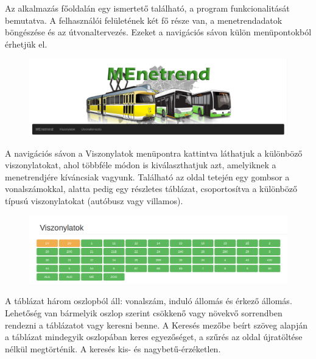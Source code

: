



Az alkalmazás főoldalán egy ismertető található, a program funkcionalitását bemutatva.
A felhasználói felületének két fő része van, a menetrendadatok böngészése és az útvonaltervezés. Ezeket a navigációs sávon külön menüpontokból érhetjük el.

\begin{figure}[htb]
\centering
\includegraphics[scale=0.32]{kepek/navbar.png}
\caption{}
\label{fig:navbar}
\end{figure}

A navigációs sávon a Viszonylatok menüpontra kattintva láthatjuk a különböző viszonylatokat, ahol többféle módon is kiválaszthatjuk azt, amelyiknek a menetrendjére kíváncsiak vagyunk. Található az oldal tetején egy gombsor a vonalszámokkal, alatta pedig egy részletes táblázat, csoportosítva a különböző típusú viszonylatokat (autóbusz vagy villamos).

\begin{figure}[htb]
\centering
\includegraphics[scale=0.32]{kepek/viszonylatok_gombsor.png}
\caption{}
\label{fig:viszonylatok_gombsor}
\end{figure}

A táblázat három oszlopból áll: vonalszám, induló állomás és érkező állomás. Lehetőség van bármelyik oszlop szerint csökkenő vagy növekvő sorrendben rendezni a táblázatot vagy keresni benne. A Keresés mezőbe beírt szöveg alapján a táblázat mindegyik oszlopában keres egyezőséget, a szűrés az oldal újratöltése nélkül megtörténik. A keresés kis- és nagybetű-érzéketlen.

